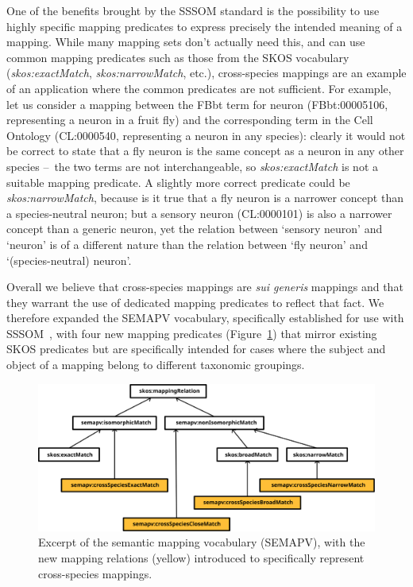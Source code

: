 \documentclass{ceurart}
\def\term#1{`#1'}
\def\property#1{\textit{#1}}
\def\curie#1{\textsf{#1}}
\begin{document}
One of the benefits brought by the SSSOM standard is the possibility to
use highly specific mapping predicates to express precisely the intended
meaning of a mapping. While many mapping sets don’t actually need this,
and can use common mapping predicates such as those from the SKOS
vocabulary~\cite{bechhofer2009} (\property{skos:exactMatch},
\property{skos:narrowMatch}, etc.), cross-species mappings are an
example of an application where the common predicates are not
sufficient. For example, let us consider a mapping between the FBbt term
for neuron (\curie{FBbt:00005106}, representing a neuron in a fruit fly)
and the corresponding term in the Cell Ontology (\curie{CL:0000540},
representing a neuron in any species): clearly it would not be correct
to state that a fly neuron is the same concept as a neuron in any other
species --~the two terms are not interchangeable, so
\property{skos:exactMatch} is not a suitable mapping predicate.  A
slightly more correct predicate could be \property{skos:narrowMatch},
because is it true that a fly neuron is a narrower concept than a
species-neutral neuron; but a sensory neuron (\curie{CL:0000101}) is
also a narrower concept than a generic neuron, yet the relation between
\term{sensory neuron} and \term{neuron} is of a different nature than
the relation between \term{fly neuron} and \term{(species-neutral)
neuron}.

Overall we believe that cross-species mappings are \emph{sui generis}
mappings and that they warrant the use of dedicated mapping predicates
to reflect that fact. We therefore expanded the SEMAPV vocabulary,
specifically established for use with SSSOM~\cite{matentzoglu2022}, with
four new mapping predicates (Figure~\ref{fig:relations}) that mirror
existing SKOS predicates but are specifically intended for cases where
the subject and object of a mapping belong to different taxonomic
groupings.

\begin{figure}
  \centering
  \includegraphics[width=.8\linewidth]{figs/relations}
  \caption{Excerpt of the semantic mapping vocabulary (SEMAPV), with the
  new mapping relations (yellow) introduced to specifically represent
  cross-species mappings.}
  \label{fig:relations}
\end{figure}
\end{document}
